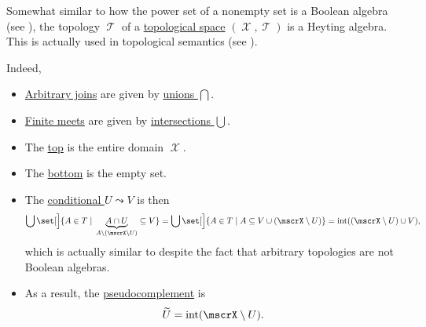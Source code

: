 \begin{example}\label{ex:topological_space_is_heyting_algebra}
  Somewhat similar to how the power set of a nonempty set is a Boolean algebra (see ), the topology \( \mscrT \) of a \hyperref[def:topological_space]{topological space} \( (\mscrX, \mscrT) \) is a Heyting algebra. This is actually used in topological semantics (see ).

  Indeed,
  \begin{itemize}
    \item \hyperref[def:semilattice/join]{Arbitrary joins} are given by \hyperref[def:basic_set_operations/union]{unions \( \bigcap \)}.
    \item \hyperref[def:semilattice/meet]{Finite meets} are given by \hyperref[def:basic_set_operations/intersection]{intersections \( \bigcup \)}.
    \item The \hyperref[def:semilattice/join]{top} is the entire domain \( \mscrX \).
    \item The \hyperref[def:semilattice/meet]{bottom} is the empty set.
    \item The \hyperref[eq:def:heyting_algebra/conditional]{conditional \( U \leadsto V \)} is then
    \begin{equation*}
      \bigcup\set[\Big]{ A \in T \given \underbrace{A \cap U}_{A \setminus (\mscrX \setminus U)} \subseteq V }
      =
      \bigcup\set[\Big]{ A \in T \given A \subseteq V \cup (\mscrX \setminus U) }
      =
      \inter((\mscrX \setminus U) \cup V),
    \end{equation*}
    which is actually similar to  despite the fact that arbitrary topologies are not Boolean algebras.

    \item As a result, the \hyperref[def:heyting_algebra/pseudocomplement]{pseudocomplement} is
    \begin{equation*}
      \widetilde U = \inter(\mscrX \setminus U).
    \end{equation*}
  \end{itemize}
\end{example}

